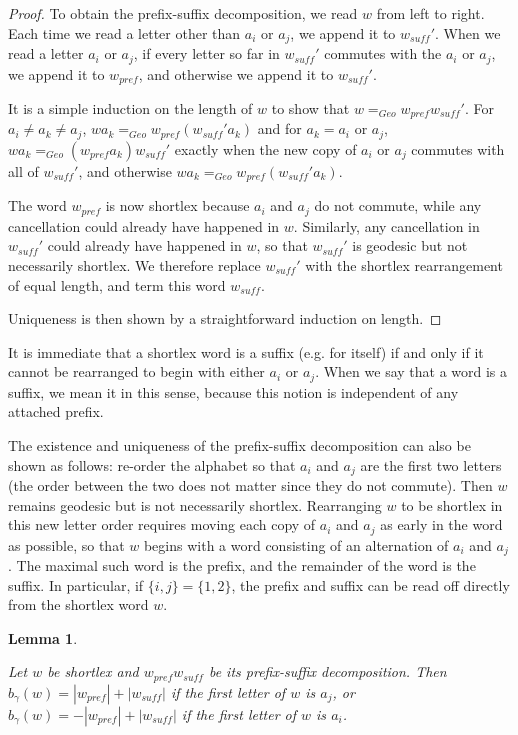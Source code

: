\documentclass[10pt,a4paper]{amsart}
\newtheorem{lemma}[theorem]{Lemma}
\theoremstyle{definition}
\theoremstyle{remark}
\begin{document}
	\begin{proof}
		
		To obtain the prefix-suffix decomposition, we read $w$ from left to right. Each time we read a letter other than $a_i$ or $a_j$, we append it to $w_{suff}'$. When we read a letter $a_i$ or $a_j$, if every letter so far in $w_{suff}'$ commutes with the $a_i$ or $a_j$, we append it to $w_{pref}$, and otherwise we append it to $w_{suff}'$.
		
		It is a simple induction on the length of $w$ to show that $w=_{Geo}w_{pref}w_{suff}'$. For $a_i\ne a_k\ne a_j$, $wa_k=_{Geo}w_{pref}(w_{suff}'a_k)$ and for $a_k=a_i$ or $a_j$, $wa_k=_{Geo}(w_{pref}a_k)w_{suff}'$ exactly when the new copy of $a_i$ or $a_j$ commutes with all of $w_{suff}'$, and otherwise \newline $wa_k=_{Geo}w_{pref}(w_{suff}'a_k)$.
		
		The word $w_{pref}$ is now shortlex because $a_i$ and $a_j$ do not commute, while any cancellation could already have happened in $w$. Similarly, any cancellation in $w_{suff}'$ could already have happened in $w$, so that $w_{suff}'$ is geodesic but not necessarily shortlex. We therefore replace $w_{suff}'$ with the shortlex rearrangement of equal length, and term this word $w_{suff}$.
		
		Uniqueness is then shown by a straightforward induction on length.		
	\end{proof}
	
	It is immediate that a shortlex word is a suffix (e.g. for itself) if and only if it cannot be rearranged to begin with either $a_i$ or $a_j$. When we say that a word is a suffix, we mean it in this sense, because this notion is independent of any attached prefix.
	
	The existence and uniqueness of the prefix-suffix decomposition can also be shown as follows: re-order the alphabet so that $a_i$ and $a_j$ are the first two letters (the order between the two does not matter since they do not commute). Then $w$ remains geodesic but is not necessarily shortlex. Rearranging $w$ to be shortlex in this new letter order requires moving each copy of $a_i$ and $a_j$ as early in the word as possible, so that $w$ begins with a word consisting of an alternation of $a_i$ and $a_j$. The maximal such word is the prefix, and the remainder of the word is the suffix. In particular, if $\{i,j\}=\{1,2\}$, the prefix and suffix can be read off directly from the shortlex word $w$. 
	
	\begin{lemma} \label{CalculatingBusemannFunctions}
		
		Let $w$ be shortlex and $w_{pref}w_{suff}$ be its prefix-suffix decomposition. Then $b_\gamma(w)=|w_{pref}|+|w_{suff}|$ if the first letter of $w$ is $a_j$, or $b_\gamma(w)=-|w_{pref}|+|w_{suff}|$ if the first letter of $w$ is $a_i$.
	\end{lemma}
	
\end{document}
